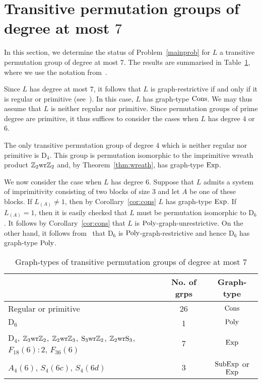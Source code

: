 \documentclass{amsart}
\theoremstyle{definition}
\begin{document}
\section{Transitive permutation groups of degree at most $7$}
\label{sec:smalldegree}

In this section, we determine the status of Problem~\ref{mainprob} for $L$ a transitive permutation group of degree at most $7$. The results are summarised in Table~\ref{table:degree7}, where we use the notation from~\cite{conway}.

Since $L$ has degree at most $7$, it follows that $L$ is graph-restrictive if and only if it is regular or primitive (see~\cite[Proposition~$14$]{PSVRestrictive}). In this case, $L$ has graph-type ${\mathop{\rm Cons}}$. We may thus assume that $L$ is neither regular nor primitive. Since permutation groups of prime degree are primitive, it thus suffices to consider the cases when $L$ has degree $4$ or $6$. 

The only transitive permutation group of degree $4$ which is neither regular nor primitive is ${\mathrm D}_4$. This group is permutation isomorphic to the imprimitive wreath product ${\mathbb Z}_2{\mathop{\rm wr}}{\mathbb Z}_2$ and, by Theorem~\ref{thm:wreath}, has graph-type ${\mathop{\rm Exp}}$. 

We now consider the case when $L$ has degree $6$. Suppose that $L$ admits a system of imprimitivity consisting of two blocks of size $3$ and let $A$ be one of these blocks. If $L_{(A)}\neq 1$, then by Corollary~\ref{cor:cons} $L$ has graph-type ${\mathop{\rm Exp}}$. If $L_{(A)}=1$, then it is easily checked that $L$ must be permutation isomorphic to ${\mathrm D}_6$. It follows by Corollary~\ref{cor:cons} that $L$ is ${\mathop{\rm Poly}}$-graph-unrestrictive. On the other hand, it follows from~\cite[Theorem A]{Verret2} that ${\mathrm D}_6$ is ${\mathop{\rm Poly}}$-graph-restrictive and hence ${\mathrm D}_6$ has graph-type ${\mathop{\rm Poly}}$. 

\begin{scriptsize}
\begin{table}[hhh!]
\begin{center}
\begin{tabular}{|p{90mm}|c|c|}\hline
 & No. of grps & Graph-type  \\\hline
Regular or primitive &26  & ${\mathop{\rm Cons}}$ \\\hline
${\mathrm D}_6$ & 1 & ${\mathop{\rm Poly}}$  \\\hline
${\mathrm D}_4$, ${\mathbb Z}_3{\mathop{\rm wr}}{\mathbb Z}_2$, ${\mathbb Z}_2{\mathop{\rm wr}}{\mathbb Z}_3$, ${\mathrm{S}}_3{\mathop{\rm wr}}{\mathbb Z}_2$, ${\mathbb Z}_2{\mathop{\rm wr}}{\mathrm{S}}_3$, $F_{18}(6)\colon 2$, $F_{36}(6)$ & 7 & ${\mathop{\rm Exp}}$  \\\hline
$A_4(6)$, $S_4(6c)$, $S_4(6d)$ & 3 & ${\mathop{\rm SubExp}}$ or ${\mathop{\rm Exp}}$  \\\hline
\end{tabular}
\medskip
\caption{\scriptsize{Graph-types of transitive permutation groups of degree at most $7$}}\label{table:degree7}
\end{center}
\end{table}
\end{scriptsize}
\end{document}
